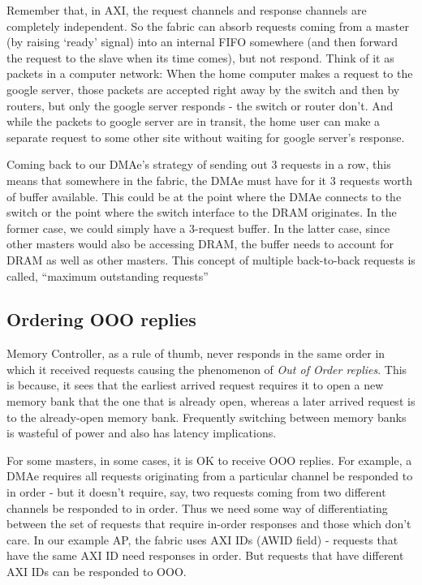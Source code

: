 Remember that, in AXI, the request channels and response channels are completely independent. So the fabric can absorb requests coming from a master (by raising `ready' signal) into an internal FIFO somewhere (and then forward the request to the slave when its time comes), but not respond. Think of it as packets in a computer network: When the home computer makes a request to the google server, those packets are accepted right away by the switch and then by routers, but only the google server responds - the switch or router don't. And while the packets to google server are in transit, the home user can make a separate request to some other site without waiting for google server's response.

Coming back to our DMAe's strategy of sending out 3 requests in a row, this means that somewhere in the fabric, the DMAe must have for it 3 requests worth of buffer available. This could be at the point where the DMAe connects to the switch or the point where the switch interface to the DRAM originates. In the former case, we could simply have a 3-request buffer. In the latter case, since other masters would also be accessing DRAM, the buffer needs to account for DRAM as well as other masters. This concept of multiple back-to-back requests is called, ``maximum outstanding requests''

\subsection{Ordering OOO replies}
Memory Controller, as a rule of thumb, never responds in the same order in which it received requests causing the phenomenon of \emph{Out of Order replies}. This is because, it sees that the earliest arrived request requires it to open a new memory bank that the one that is already open, whereas a later arrived request is to the already-open memory bank. Frequently switching between memory banks is wasteful of power and also has latency implications. 

For some masters, in some cases, it is OK to receive OOO replies. For example, a DMAe requires all requests originating from a particular channel be responded to in order - but it doesn't require, say, two requests coming from two different channels be responded to in order. Thus we need some way of differentiating between the set of requests that require in-order responses and those which don't care. In our example AP, the fabric uses AXI IDs (AWID field) - requests that have the same AXI ID need responses in order. But requests that have different AXI IDs can be responded to OOO.

